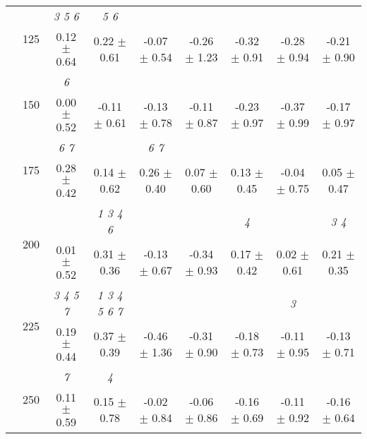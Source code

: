 \begin{table}[h]
{\begin{tabular}{
        ccccccccc}
 & \multirow{2}{*}{125}& \cellcolor[HTML]{EFEFEF} \textit{ 3 5 6 }& \cellcolor[HTML]{EFEFEF} \textit{ 5 6 }& \cellcolor[HTML]{EFEFEF} & \cellcolor[HTML]{EFEFEF} & \cellcolor[HTML]{EFEFEF} & \cellcolor[HTML]{EFEFEF} & \cellcolor[HTML]{EFEFEF}  \\ 
 & & \cellcolor[HTML]{EFEFEF} 0.12 $\pm$ 0.64& \cellcolor[HTML]{EFEFEF} 0.22 $\pm$ 0.61& \cellcolor[HTML]{EFEFEF} -0.07 $\pm$ 0.54& \cellcolor[HTML]{EFEFEF} -0.26 $\pm$ 1.23& \cellcolor[HTML]{EFEFEF} -0.32 $\pm$ 0.91& \cellcolor[HTML]{EFEFEF} -0.28 $\pm$ 0.94& \cellcolor[HTML]{EFEFEF} -0.21 $\pm$ 0.90 \\ 
 & \multirow{2}{*}{150}& \textit{ 6 }& & & & & &  \\ 
 & & 0.00 $\pm$ 0.52& -0.11 $\pm$ 0.61& -0.13 $\pm$ 0.78& -0.11 $\pm$ 0.87& -0.23 $\pm$ 0.97& -0.37 $\pm$ 0.99& -0.17 $\pm$ 0.97 \\ 
 & \multirow{2}{*}{175}& \cellcolor[HTML]{EFEFEF} \textit{ 6 7 }& \cellcolor[HTML]{EFEFEF} & \cellcolor[HTML]{EFEFEF} \textit{ 6 7 }& \cellcolor[HTML]{EFEFEF} & \cellcolor[HTML]{EFEFEF} & \cellcolor[HTML]{EFEFEF} & \cellcolor[HTML]{EFEFEF}  \\ 
 & & \cellcolor[HTML]{EFEFEF} 0.28 $\pm$ 0.42& \cellcolor[HTML]{EFEFEF} 0.14 $\pm$ 0.62& \cellcolor[HTML]{EFEFEF} 0.26 $\pm$ 0.40& \cellcolor[HTML]{EFEFEF} 0.07 $\pm$ 0.60& \cellcolor[HTML]{EFEFEF} 0.13 $\pm$ 0.45& \cellcolor[HTML]{EFEFEF} -0.04 $\pm$ 0.75& \cellcolor[HTML]{EFEFEF} 0.05 $\pm$ 0.47 \\ 
 & \multirow{2}{*}{200}& & \textit{ 1 3 4 6 }& & & \textit{ 4 }& & \textit{ 3 4 } \\ 
 & & 0.01 $\pm$ 0.52& 0.31 $\pm$ 0.36& -0.13 $\pm$ 0.67& -0.34 $\pm$ 0.93& 0.17 $\pm$ 0.42& 0.02 $\pm$ 0.61& 0.21 $\pm$ 0.35 \\ 
 & \multirow{2}{*}{225}& \cellcolor[HTML]{EFEFEF} \textit{ 3 4 5 7 }& \cellcolor[HTML]{EFEFEF} \textit{ 1 3 4 5 6 7 }& \cellcolor[HTML]{EFEFEF} & \cellcolor[HTML]{EFEFEF} & \cellcolor[HTML]{EFEFEF} & \cellcolor[HTML]{EFEFEF} \textit{ 3 }& \cellcolor[HTML]{EFEFEF}  \\ 
 & & \cellcolor[HTML]{EFEFEF} 0.19 $\pm$ 0.44& \cellcolor[HTML]{EFEFEF} 0.37 $\pm$ 0.39& \cellcolor[HTML]{EFEFEF} -0.46 $\pm$ 1.36& \cellcolor[HTML]{EFEFEF} -0.31 $\pm$ 0.90& \cellcolor[HTML]{EFEFEF} -0.18 $\pm$ 0.73& \cellcolor[HTML]{EFEFEF} -0.11 $\pm$ 0.95& \cellcolor[HTML]{EFEFEF} -0.13 $\pm$ 0.71 \\ 
 & \multirow{2}{*}{250}& \textit{ 7 }& \textit{ 4 }& & & & &  \\ 
 & & 0.11 $\pm$ 0.59& 0.15 $\pm$ 0.78& -0.02 $\pm$ 0.84& -0.06 $\pm$ 0.86& -0.16 $\pm$ 0.69& -0.11 $\pm$ 0.92& -0.16 $\pm$ 0.64 \\ 

\end{tabular}}
\end{table}
